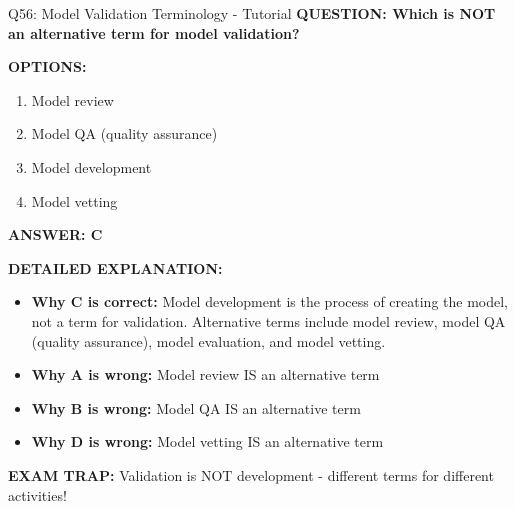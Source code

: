 \documentclass[8pt]{beamer}
\begin{document}
	\begin{frame}{Q56: Model Validation Terminology - Tutorial}
		\fontsize{6.5}{7.5}\selectfont
		\textbf{QUESTION: Which is NOT an alternative term for model validation?}
		
		\vspace{0.1cm}
		\textbf{OPTIONS:}
		\begin{enumerate}
			\item Model review
			\item Model QA (quality assurance)
			\item Model development
			\item Model vetting
		\end{enumerate}
		
		\vspace{0.1cm}
		\textcolor{myblue}{\textbf{ANSWER: C}}
		
		\vspace{0.1cm}
		\textbf{DETAILED EXPLANATION:}
		\begin{itemize}
			\item \textbf{Why C is correct:} Model development is the process of creating the model, not a term for validation. Alternative terms include model review, model QA (quality assurance), model evaluation, and model vetting.
			\item \textbf{Why A is wrong:} Model review IS an alternative term
			\item \textbf{Why B is wrong:} Model QA IS an alternative term
			\item \textbf{Why D is wrong:} Model vetting IS an alternative term
		\end{itemize}
		
		\textcolor{myred}{\textbf{EXAM TRAP:}} Validation is NOT development - different terms for different activities!
	\end{frame}
	
\end{document}
